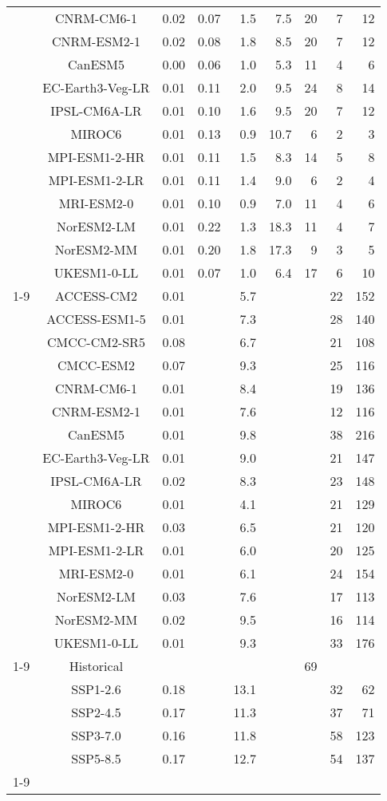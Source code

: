 \begin{table*}[t]
\begin{tabular}{c|c|rr|rr|rrr}
 & CNRM-CM6-1 & 0.02 & 0.07 & 1.5 & 7.5 & 20 & 7 & 12 \\
 & CNRM-ESM2-1 & 0.02 & 0.08 & 1.8 & 8.5 & 20 & 7 & 12 \\
 & CanESM5 & 0.00 & 0.06 & 1.0 & 5.3 & 11 & 4 & 6 \\
 & EC-Earth3-Veg-LR & 0.01 & 0.11 & 2.0 & 9.5 & 24 & 8 & 14 \\
 & IPSL-CM6A-LR & 0.01 & 0.10 & 1.6 & 9.5 & 20 & 7 & 12 \\
 & MIROC6 & 0.01 & 0.13 & 0.9 & 10.7 & 6 & 2 & 3 \\
 & MPI-ESM1-2-HR & 0.01 & 0.11 & 1.5 & 8.3 & 14 & 5 & 8 \\
 & MPI-ESM1-2-LR & 0.01 & 0.11 & 1.4 & 9.0 & 6 & 2 & 4 \\
 & MRI-ESM2-0 & 0.01 & 0.10 & 0.9 & 7.0 & 11 & 4 & 6 \\
 & NorESM2-LM & 0.01 & 0.22 & 1.3 & 18.3 & 11 & 4 & 7 \\
 & NorESM2-MM & 0.01 & 0.20 & 1.8 & 17.3 & 9 & 3 & 5 \\
 & UKESM1-0-LL & 0.01 & 0.07 & 1.0 & 6.4 & 17 & 6 & 10 \\
\cline{1-9}
\multirow[c]{16}{*}{Scenario uncertainty} & ACCESS-CM2 & 0.01 &  & 5.7 &  &  & 22 & 152 \\
 & ACCESS-ESM1-5 & 0.01 &  & 7.3 &  &  & 28 & 140 \\
 & CMCC-CM2-SR5 & 0.08 &  & 6.7 &  &  & 21 & 108 \\
 & CMCC-ESM2 & 0.07 &  & 9.3 &  &  & 25 & 116 \\
 & CNRM-CM6-1 & 0.01 &  & 8.4 &  &  & 19 & 136 \\
 & CNRM-ESM2-1 & 0.01 &  & 7.6 &  &  & 12 & 116 \\
 & CanESM5 & 0.01 &  & 9.8 &  &  & 38 & 216 \\
 & EC-Earth3-Veg-LR & 0.01 &  & 9.0 &  &  & 21 & 147 \\
 & IPSL-CM6A-LR & 0.02 &  & 8.3 &  &  & 23 & 148 \\
 & MIROC6 & 0.01 &  & 4.1 &  &  & 21 & 129 \\
 & MPI-ESM1-2-HR & 0.03 &  & 6.5 &  &  & 21 & 120 \\
 & MPI-ESM1-2-LR & 0.01 &  & 6.0 &  &  & 20 & 125 \\
 & MRI-ESM2-0 & 0.01 &  & 6.1 &  &  & 24 & 154 \\
 & NorESM2-LM & 0.03 &  & 7.6 &  &  & 17 & 113 \\
 & NorESM2-MM & 0.02 &  & 9.5 &  &  & 16 & 114 \\
 & UKESM1-0-LL & 0.01 &  & 9.3 &  &  & 33 & 176 \\
\cline{1-9}
\multirow[c]{5}{*}{Model uncertainty} & Historical &  &  &  &  & 69 &  &  \\
 & SSP1-2.6 & 0.18 &  & 13.1 &  &  & 32 & 62 \\
 & SSP2-4.5 & 0.17 &  & 11.3 &  &  & 37 & 71 \\
 & SSP3-7.0 & 0.16 &  & 11.8 &  &  & 58 & 123 \\
 & SSP5-8.5 & 0.17 &  & 12.7 &  &  & 54 & 137 \\
\cline{1-9}
\bottomrule
\end{tabular}
\end{table*}
